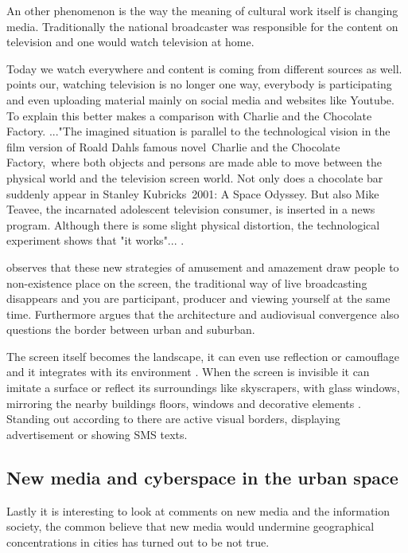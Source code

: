 \documentclass[a4paper, 11pt]{article}
\begin{document}
An other phenomenon is the way the meaning of cultural work itself is changing media. Traditionally the national broadcaster was responsible for the content on television and one would watch television at home. 

Today we watch everywhere and content is coming from different sources as well.\cite{shirky2010} points our, watching television is no longer one way, everybody is participating and even uploading material mainly on social media and websites like Youtube.
To explain this better \cite{Slaatta2006} makes a comparison with Charlie and the Chocolate Factory. ..."The imagined situation is parallel to the technological vision in the film version of Roald Dahls famous novel Charlie and the Chocolate Factory, where both objects and persons are made able to move between the physical world and the television screen world. Not only does a chocolate bar suddenly appear in Stanley Kubricks 2001: A Space Odyssey. But also Mike Teavee, the incarnated adolescent television consumer, is inserted in a news program. Although there is some slight physical distortion, the technological experiment shows that "it works"... \citep[P.1]{Slaatta2006}.

\cite{Slaatta2006} observes that these new strategies of amusement and amazement draw people to non-existence place on the screen, the traditional way of live broadcasting disappears and you are participant, producer and viewing yourself at the same time. Furthermore \cite{Slaatta2006} argues that the architecture and audiovisual convergence also questions the border between urban and suburban.

The screen itself becomes the landscape, it can even use reflection or camouflage and it integrates with its environment \cite{Slaatta2006}. When the screen is invisible it can imitate a surface or reflect its surroundings like skyscrapers, with glass windows, mirroring the nearby buildings floors, windows and decorative elements \citep{Slaatta2006}. Standing out according to \cite{Slaatta2006} there are active visual borders, displaying advertisement or showing SMS texts.

\subsection{New media and cyberspace in the urban space}

Lastly it is interesting to look at \cite{Graham} comments on new media and the information society, the common believe that new media would undermine geographical concentrations in cities has turned out to be not true.
\end{document}
